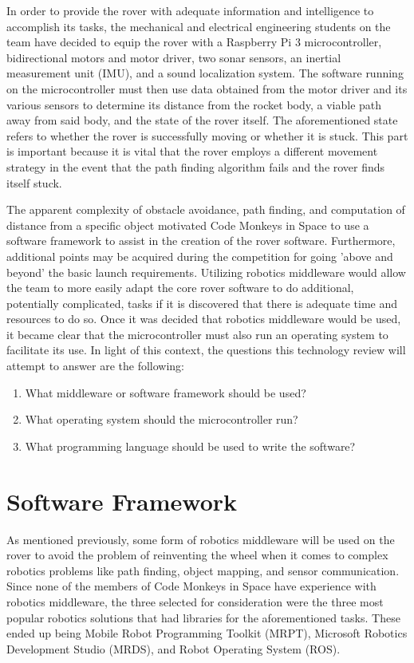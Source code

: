 \documentclass[onecolumn, draftclsnofoot,10pt, compsoc]{IEEEtran}
\begin{document}
In order to provide the rover with adequate information and intelligence to accomplish its tasks, the mechanical and electrical engineering students on the team have decided to equip the rover with a Raspberry Pi 3 microcontroller, bidirectional motors and motor driver, two sonar sensors, an inertial measurement unit (IMU), and a sound localization system. The software running on the microcontroller must then use data obtained from the motor driver and its various sensors to determine its distance from the rocket body, a viable path away from said body, and the state of the rover itself. The aforementioned state refers to whether the rover is successfully moving or whether it is stuck. This part is important because it is vital that the rover employs a different movement strategy in the event that the path finding algorithm fails and the rover finds itself stuck. 

The apparent complexity of obstacle avoidance, path finding, and computation of distance from a specific object motivated Code Monkeys in Space to use a software framework to assist in the creation of the rover software. Furthermore, additional points may be acquired during the competition for going 'above and beyond' the basic launch requirements. Utilizing robotics middleware would allow the team to more easily adapt the core rover software to do additional, potentially complicated, tasks if it is discovered that there is adequate time and resources to do so. Once it was decided that robotics middleware would be used, it became clear that the microcontroller must also run an operating system to facilitate its use. In light of this context, the questions this technology review will attempt to answer are the following:
\begin{enumerate}
\item What middleware or software framework should be used?
\item What operating system should the microcontroller run?
\item What programming language should be used to write the software?
\end{enumerate}
\section{Software Framework}
As mentioned previously, some form of robotics middleware will be used on the rover to avoid the problem of reinventing the wheel when it comes to complex robotics problems like path finding, object mapping, and sensor communication. Since none of the members of Code Monkeys in Space have experience with robotics middleware, the three selected for consideration were the three most popular robotics solutions that had libraries for the aforementioned tasks. These ended up being Mobile Robot Programming Toolkit (MRPT), Microsoft Robotics Development Studio (MRDS), and Robot Operating System (ROS).
\end{document}
